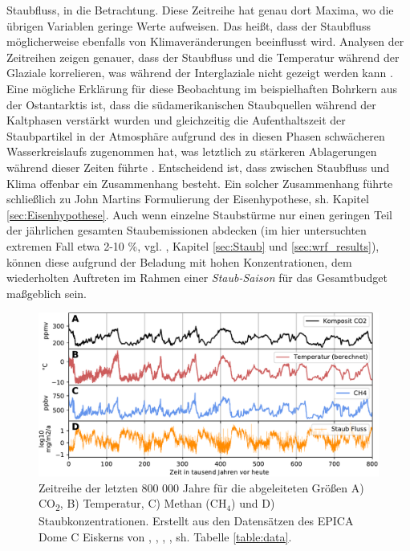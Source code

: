 \documentclass[12pt,a4paper,onecolumn,headheight=30pt]{scrartcl}
\newcommand{\cotwo}{CO\textsubscript{2}}
\begin{document}
Staubfluss, in die Betrachtung. Diese Zeitreihe hat genau dort Maxima, wo die übrigen Variablen geringe Werte aufweisen. Das heißt, dass der Staubfluss möglicherweise ebenfalls von Klimaveränderungen beeinflusst wird. Analysen der Zeitreihen zeigen genauer, dass der Staubfluss und die Temperatur während der Glaziale korrelieren, was während der Interglaziale nicht gezeigt werden kann \citep{Lambert.2008}. Eine mögliche Erklärung für diese Beobachtung im beispielhaften Bohrkern aus der Ostantarktis ist, dass die südamerikanischen Staubquellen während der Kaltphasen verstärkt wurden und gleichzeitig die Aufenthaltszeit der Staubpartikel in der Atmosphäre aufgrund des in diesen Phasen schwächeren Wasserkreislaufs zugenommen hat, was letztlich zu stärkeren Ablagerungen während dieser Zeiten führte \citep{Lambert.2008}. Entscheidend ist, dass zwischen Staubfluss und Klima offenbar ein Zusammenhang besteht. Ein solcher Zusammenhang führte schließlich zu John Martins Formulierung der Eisenhypothese, sh. Kapitel \ref{sec:Eisenhypothese}. Auch wenn einzelne Staubstürme nur einen geringen Teil der jährlichen gesamten Staubemissionen abdecken (im hier untersuchten extremen Fall etwa 2-10 \%, vgl. \citep{Shao.2011}, Kapitel \ref{sec:Staub} und \ref{sec:wrf_results}), können diese aufgrund der Beladung mit hohen Konzentrationen, dem wiederholten Auftreten im Rahmen einer \textit{Staub-Saison} für das Gesamtbudget maßgeblich sein. \par
\begin{figure}[htbp]
\centering
\includegraphics[width=\textwidth]{bilder/epica_icecore.pdf}
\caption{Zeitreihe der letzten 800 000 Jahre für die abgeleiteten Größen A) \cotwo, B) Temperatur, C) Methan (CH$_4$) und D) Staubkonzentrationen. Erstellt aus den Datensätzen des EPICA Dome C Eiskerns von \cite{Jouzel.2007}, \cite{Lambert.2012}, \cite{Loulergue.2008}, \cite{Bereiter.2015}, sh. Tabelle \ref{table:data}.}   \label{fig:icecore}
\end{figure}
\end{document}
